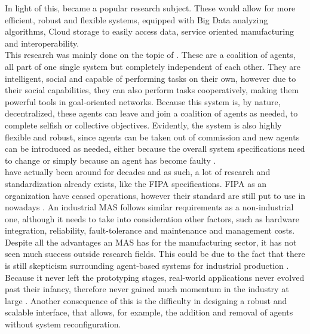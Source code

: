 In light of this,  became a popular research subject. These  would allow for more efficient, robust and flexible systems, equipped with Big Data analyzing algorithms, Cloud storage to easily access data, service oriented manufacturing and interoperability.\\

This research was mainly done on the topic of  \cite{sakurada01} \cite{karnouskos01}. These  are a coalition of agents, all part of one single system but completely independent of each other. They are intelligent, social and capable of performing tasks on their own, however due to their social capabilities, they can also perform tasks cooperatively, making them powerful tools in goal-oriented networks. Because this system is, by nature, decentralized, these agents can leave and join a coalition of agents as needed, to complete selfish or collective objectives. Evidently, the system is also highly flexible and robust, since agents can be taken out of commission and new agents can be introduced as needed, either because the overall system specifications need to change or simply because an agent has become faulty \cite{paulo02}. \\

  have actually been around for decades and as such, a lot of research and standardization already exists, like the \gls{FIPA} specifications. \gls{FIPA} as an organization have ceased operations, however their standard are still put to use in  nowadays \cite{FIPA_website}. An industrial \acrshort{MAS} follows similar requirements as a non-industrial one, although it needs to take into consideration other factors, such as hardware integration, reliability, fault-tolerance and maintenance and management costs.\\

Despite all the advantages an \acrshort{MAS} has for the manufacturing sector, it has not seen much success outside research fields. This could be due to the fact that there is still skepticism surrounding agent-based systems for industrial production \cite{bottling_plant_part2}. Because it never left the prototyping stages, real-world applications never evolved past their infancy, therefore never gained much momentum in the industry at large \cite{karnouskos02}. Another consequence of this is the difficulty in designing a robust and scalable interface, that allows, for example, the addition and removal of agents without system reconfiguration. 

